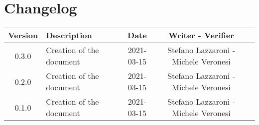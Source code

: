 \section*{Changelog}

\begin{center}
	\begin{longtable}{|c|p{5cm}|c|c|c|}
	\hline
	\rowcolor{lighter-grayer}
	\textbf{Version} & \textbf{Description} & \textbf{Date} & \textbf{Writer - Verifier} \\
	\hline
	\endfirsthead


	\hline
	0.3.0 & Creation of the document & 2021-03-15 & Stefano Lazzaroni - Michele Veronesi\\
	0.2.0 & Creation of the document & 2021-03-15 & Stefano Lazzaroni - Michele Veronesi\\
	0.1.0 & Creation of the document & 2021-03-15 & Stefano Lazzaroni - Michele Veronesi\\

	\hline

	\end{longtable}
\end{center}